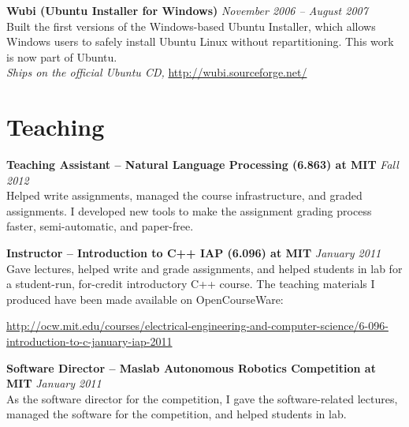 \documentclass[margin,line]{resume}
\begin{document}
\begin{resume}
\textbf{Wubi (Ubuntu Installer for Windows)} \hfill \textsl{November 2006 -- August 2007}\\
Built the first versions of the Windows-based Ubuntu Installer, which allows Windows users to safely install Ubuntu Linux without repartitioning. This work is now part of Ubuntu. \\
\emph{Ships on the official Ubuntu CD,} \url{http://wubi.sourceforge.net/}

\pagebreak

\section{\mysidestyle Teaching}

\textbf{Teaching Assistant -- Natural Language Processing (6.863) at MIT} \hfill \textsl{Fall 2012} \\
Helped write assignments, managed the course infrastructure, and graded assignments. I developed new tools to make the assignment grading process faster, semi-automatic, and paper-free.

\textbf{Instructor -- Introduction to C++ IAP (6.096) at MIT} \hfill \textsl{January 2011}\\
Gave lectures, helped write and grade assignments, and helped students in lab for a student-run, for-credit introductory C++ course. The teaching materials I produced have been made available on OpenCourseWare:

\vspace{-4mm}

\url{http://ocw.mit.edu/courses/electrical-engineering-and-computer-science/6-096-introduction-to-c-january-iap-2011} \\

\vspace{-5mm}

\textbf{Software Director -- Maslab Autonomous Robotics Competition at MIT} \hfill \textsl{January 2011}\\
As the software director for the competition, I gave the software-related lectures,
managed the software for the competition, and helped students in lab.




\end{resume}
\end{document}

